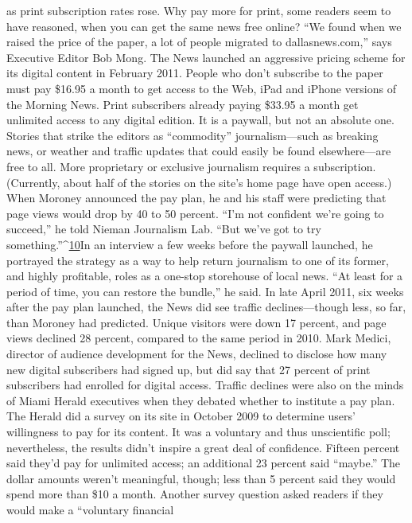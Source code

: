 as print subscription rates rose. Why pay more for print, some readers seem to
have reasoned, when you can get the same news free online? ``We found when
we raised the price of the paper, a lot of people migrated to dallasnews.com,'' says
Executive Editor Bob Mong.
The News launched an aggressive pricing scheme for its digital content in
February 2011. People who don't subscribe to the paper must pay \$16.95 a
month to get access to the Web, iPad and iPhone versions of the Morning News.
Print subscribers already paying \$33.95 a month get unlimited access to any
digital edition.
It is a paywall, but not an absolute one. Stories that strike the editors as ``commodity''
journalism—such as breaking news, or weather and traffic updates that
could easily be found elsewhere—are free to all. More proprietary or exclusive
journalism requires a subscription. (Currently, about half of the stories on the
site's home page have open access.)
When Moroney announced the pay plan, he and his staff were predicting that
page views would drop by 40 to 50 percent. ``I'm not confident we're going to
succeed,'' he told Nieman Journalism Lab. ``But we've got to try something.''^{\href{#endnotes-chapter-5}{10}}In
an interview a few weeks before the paywall launched, he portrayed the strategy
as a way to help return journalism to one of its former, and highly profitable,
roles as a one-stop storehouse of local news. ``At least for a period of time, you
can restore the bundle,'' he said.
In late April 2011, six weeks after the pay plan launched, the News did see
traffic declines—though less, so far, than Moroney had predicted. Unique visitors
were down 17 percent, and page views declined 28 percent, compared to the
same period in 2010. Mark Medici, director of audience development for the
News, declined to disclose how many new digital subscribers had signed up, but
did say that 27 percent of print subscribers had enrolled for digital access.
Traffic declines were also on the minds of Miami Herald executives when they
debated whether to institute a pay plan.
The Herald did a survey on its site in October 2009 to determine users' willingness
to pay for its content. It was a voluntary and thus unscientific poll; nevertheless,
the results didn't inspire a great deal of confidence. Fifteen percent said
they'd pay for unlimited access; an additional 23 percent said ``maybe.'' The dollar
amounts weren't meaningful, though; less than 5 percent said they would spend
more than \$10 a month.
Another survey question asked readers if they would make a ``voluntary financial
